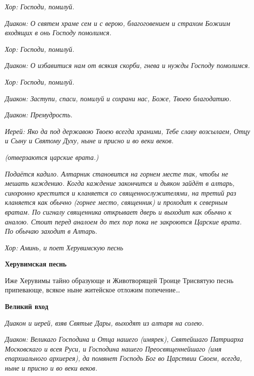  \itshape Хор:\normalfont{} Господи, помилуй.


 \itshape Диакон:\normalfont{} О святем храме сем и с верою, благоговением и страхом Божиим
входящих в онь Господу помолимся.


 \itshape Хор:\normalfont{} Господи, помилуй.


 \itshape Диакон:\normalfont{} О избавитися нам от всякия скорби, гнева и нужды Господу
помолимся.


 \itshape Хор:\normalfont{} Господи, помилуй.


 \itshape Диакон:\normalfont{} Заступи, спаси, помилуй и сохрани нас, Боже, Твоею
благодатию.


 \itshape Диакон:\normalfont{} Премудрость.


 \itshape Иерей:\normalfont{} Яко да под державою Твоею всегда храними, Тебе славу
возсылаем, Отцу и Сыну и Святому Духу, ныне и присно и во веки
веков.


 \itshape (отверзаются царские врата.)\normalfont{}


 \itshape Подаётся кадило. Алтарник становится на горнем месте так, чтобы не
мешать каждению. Когда каждение закончится и дьякон зайдёт в алтарь,
синхронно крестится и кланяется со священнослужителями, на третий раз
кланяется как обычно (горнее место, священник) и проходит к северным
вратам. По сигналу священника открывает дверь и выходит как обычно к
аналою. Стоит перед аналоем до тех пор пока не закроются Царские врата.
По обычаю заходит в Алтарь\normalfont{}.


 \itshape Хор:\normalfont{} Аминь, \itshape и поет Херувимскую песнь\normalfont{}



 

\bfseries Херувимская песнь\normalfont{}


   Иже Херувимы тайно образующе и Животворящей Троице Трисвятую
песнь припевающе, всякое ныне житейское отложим попечение…




 

\bfseries  Великий вход\normalfont{}


 \itshape Диакон и иерей, взяв Святые Дары, выходят из алтаря на солею.\normalfont{}


 \itshape Диакон:\normalfont{} Великаго Господина и Отца нашего \itshape (имярек),\normalfont{} Святейшаго
Патриарха Московскаго и всея Руси, и Господина нашего Преосвященнейшаго
\itshape (имя епархиального архиерея),\normalfont{} да помянет Господь Бог во Царствии Своем,
всегда, ныне и присно и во веки веков.


